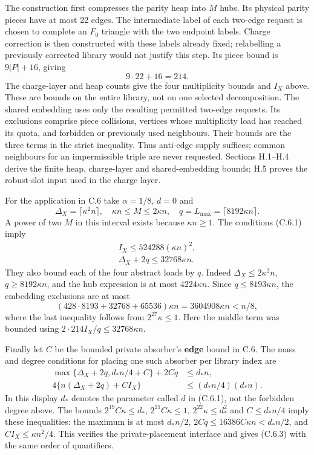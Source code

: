 \documentclass[english,11pt,a4paper]{article}
\begin{document}
The construction first compresses the parity heap into \(M\) hubs. Its physical parity pieces have at most 22 edges. The intermediate label of each two-edge request is chosen to complete an \(F_0\) triangle with the two endpoint labels. Charge correction is then constructed with these labels already fixed; relabelling a previously corrected library would not justify this step. Its piece bound is \(9|P|+16\), giving \[9\cdot22+16=214.\] The charge-layer and heap counts give the four multiplicity bounds and \(I_X\) above. These are bounds on the entire library, not on one selected decomposition. The shared embedding uses only the resulting permitted two-edge requests. Its exclusions comprise piece collisions, vertices whose multiplicity load has reached its quota, and forbidden or previously used neighbours. Their bounds are the three terms in the strict inequality. Thus anti-edge supply suffices; common neighbours for an impermissible triple are never requested. Sections H.1--H.4 derive the finite heap, charge-layer and shared-embedding bounds; H.5 proves the robust-slot input used in the charge layer.

For the application in C.6 take \(\alpha=1/8\), \(d=0\) and \[\Delta_X=\lceil\kappa^2n\rceil,\quad
\kappa n\le M\le2\kappa n,\quad
q=L_{\max}=\lceil8192\kappa n\rceil.\] A power of two \(M\) in this interval exists because \(\kappa n\ge1\). The conditions (C.6.1) imply \[\begin{gathered}
I_X\le524288(\kappa n)^2,\\
\Delta_X+2q\le32768\kappa n.
\end{gathered}\] They also bound each of the four abstract loads by \(q\). Indeed \(\Delta_X\le2\kappa^2n\), \(q\ge8192\kappa n\), and the hub expression is at most \(4224\kappa n\). Since \(q\le8193\kappa n\), the embedding exclusions are at most \[(428\cdot8193+32768+65536)\kappa n
=3604908\kappa n<n/8,\] where the last inequality follows from \(2^{27}\kappa\le1\). Here the middle term was bounded using \(2\cdot214I_X/q\le32768\kappa n\).

Finally let \(C\) be the bounded private absorber's \textbf{edge} bound in C.6. The mass and degree conditions for placing one such absorber per library index are \[\begin{aligned}
\max\{\Delta_X+2q,d_*n/4+C\}+2Cq&\le d_*n,\\
4\{n(\Delta_X+2q)+CI_X\}&\le(d_*n/4)(d_*n).
\end{aligned}\] In this display \(d_*\) denotes the parameter called \(d\) in (C.6.1), not the forbidden degree above. The bounds \(2^{19}C\kappa\le d_*\), \(2^{21}C\kappa\le1\), \(2^{22}\kappa\le d_*^2\) and \(C\le d_*n/4\) imply these inequalities: the maximum is at most \(d_*n/2\), \(2Cq\le16386C\kappa n<d_*n/2\), and \(CI_X\le\kappa n^2/4\). This verifies the private-placement interface and gives (C.6.3) with the same order of quantifiers.
\end{document}

